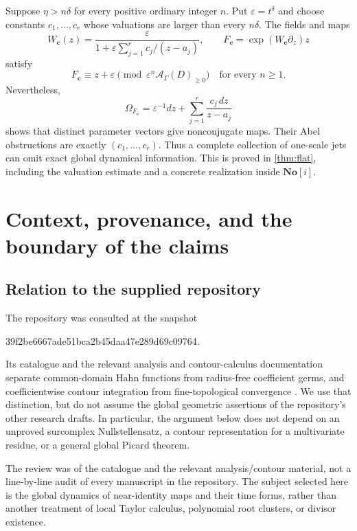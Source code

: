 \documentclass[11pt,a4paper]{article}
\numberwithin{equation}{section}
\theoremstyle{definition}
\theoremstyle{remark}
\newcommand{\No}{\mathbf{No}}
\newcommand{\A}{\mathcal A}
\newcommand{\eps}{\varepsilon}
\begin{document}
Suppose $\eta>n\delta$ for every positive ordinary integer $n$.  Put
$\eps=t^\delta$ and choose constants $c_1,\ldots,c_r$ whose valuations are
larger than every $n\delta$.  The fields and maps
\begin{equation}\label{eq:flat-intro}
 W_{\mathbf c}(z)=
 \frac{\eps}{1+\eps\displaystyle\sum_{j=1}^r c_j/(z-a_j)},
 \qquad F_{\mathbf c}=\exp(W_{\mathbf c}\partial_z)z
\end{equation}
satisfy
\[
 F_{\mathbf c}\equiv z+\eps\pmod{\eps^n\A_\Gamma(D)_{\geq0}}
 \quad\text{for every }n\geq1.
\]
Nevertheless,
\begin{equation}\label{eq:flat-time-intro}
 \Omega_{F_{\mathbf c}}=\eps^{-1}dz+
       \sum_{j=1}^r\frac{c_j\,dz}{z-a_j}
\end{equation}
shows that distinct parameter vectors give nonconjugate maps.  Their Abel
obstructions are exactly $(c_1,\ldots,c_r)$.  Thus a complete collection of
one-scale jets can omit exact global dynamical information.
This is proved in \cref{thm:flat}, including the valuation estimate and a
concrete realization inside $\No[i]$.

\section{Context, provenance, and the boundary of the claims}
\label{sec:context}

\subsection{Relation to the supplied repository}

The repository was consulted at the snapshot
\begin{center}
\small\ttfamily 39f2be6667ade51bca2b45daa47e289d69c09764.
\end{center}
Its catalogue and the relevant analysis and contour-calculus documentation
separate common-domain Hahn functions from radius-free coefficient germs,
and coefficientwise contour integration from fine-topological convergence
\cite{repo-catalogue,repo-analysis,repo-contours}.  We use that distinction,
but do not assume the global geometric assertions of the repository's other
research drafts.  In particular, the argument below does not depend on an
unproved surcomplex Nullstellensatz, a contour representation for a
multivariate residue, or a general global Picard theorem.

The review was of the catalogue and the relevant analysis/contour material,
not a line-by-line audit of every manuscript in the repository.  The subject
selected here is the global dynamics of near-identity maps and their time
forms, rather than another treatment of local Taylor calculus, polynomial
root clusters, or divisor existence.
\end{document}
